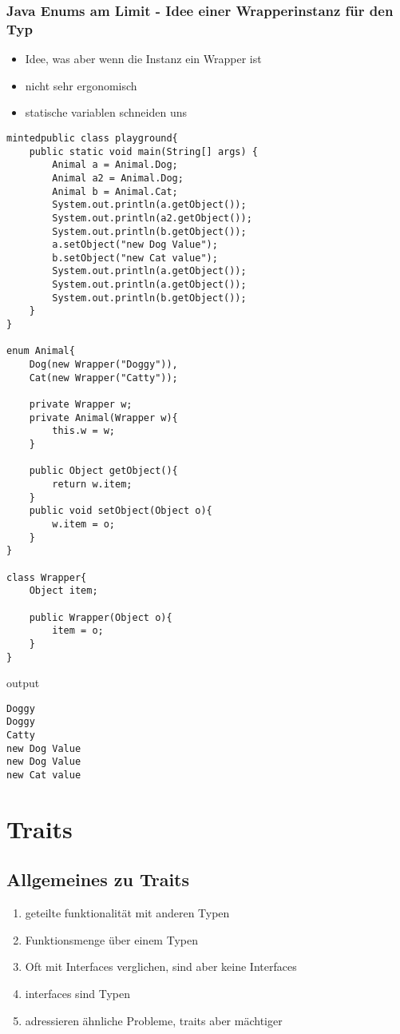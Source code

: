 \documentclass[a4paper, 1ppt]{article}
\begin{document}
\subsubsection{Java Enums am Limit - Idee einer Wrapperinstanz für den Typ}
\begin{itemize}
	\item Idee, was aber wenn die Instanz ein Wrapper ist
	\item nicht sehr ergonomisch 
	\item statische variablen schneiden uns 
\end{itemize}
\begin{verbatim}
mintedpublic class playground{
	public static void main(String[] args) {
		Animal a = Animal.Dog;
		Animal a2 = Animal.Dog;
		Animal b = Animal.Cat;
		System.out.println(a.getObject());
		System.out.println(a2.getObject());
		System.out.println(b.getObject());
		a.setObject("new Dog Value");
		b.setObject("new Cat value");
		System.out.println(a.getObject());
		System.out.println(a.getObject());
		System.out.println(b.getObject());
	}
}

enum Animal{
	Dog(new Wrapper("Doggy")),
	Cat(new Wrapper("Catty"));

	private Wrapper w;
	private Animal(Wrapper w){
		this.w = w;
	}

	public Object getObject(){
		return w.item;
	}
	public void setObject(Object o){
		w.item = o;
	}
}

class Wrapper{
	Object item;

	public Wrapper(Object o){
		item = o;
	}
}
\end{verbatim}
output
\begin{verbatim}
Doggy
Doggy
Catty
new Dog Value
new Dog Value
new Cat value
\end{verbatim}
\section{Traits}
\subsection{Allgemeines zu Traits}
\begin{enumerate}
	\item geteilte funktionalität mit anderen Typen
	\item Funktionsmenge über einem Typen
	\item Oft mit Interfaces verglichen, sind aber keine Interfaces
	\item interfaces sind Typen
	\item adressieren ähnliche Probleme, traits aber mächtiger
\end{enumerate}
\end{document}
